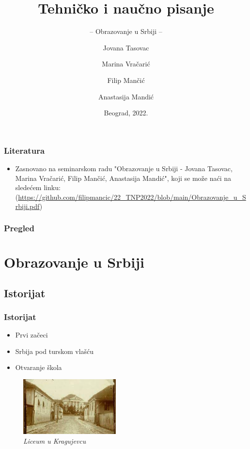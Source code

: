 \documentclass{beamer}
\title{Tehničko i naučno pisanje}
\subtitle{-- Obrazovanje u Srbiji --}
\author{Jovana Tasovac \and Marina Vračarić\\ \and Filip Mančić \and Anastasija Mandić}
\institute{Matematički fakultet\\Univerzitet u Beogradu}
\date{
	\footnotesize{Beograd, 2022.}	
}
\begin{document}
\begin{frame}
	\thispagestyle{empty}
	\titlepage
\end{frame}

\addtocounter{framenumber}{-1}

\begin{frame}[fragile]\frametitle{Literatura}
	\begin{itemize}
		\item Zasnovano na seminarskom radu "Obrazovanje u Srbiji - Jovana Tasovac, Marina Vračarić, Filip Mančić, Anastasija Mandić", koji se može naći na sledećem linku:
		(\url{https://github.com/filipmancic/22_TNP2022/blob/main/Obrazovanje_u_Srbiji.pdf})
	\end{itemize}
\end{frame}

\begin{frame}
	\frametitle{Pregled} %
	\tableofcontents[] 
\end{frame}
\section{Obrazovanje u Srbiji}

\subsection{Istorijat}

\begin{frame}[fragile]\frametitle{Istorijat}
	\begin{itemize}	
		\item Prvi začeci
		\item Srbija pod turskom vlašću
       \item Otvaranje škola
	\end{itemize}
 
        \begin{figure}[h!]
        \centering\includegraphics[height=3cm]{licej.jpg} 
        \caption{\emph{ Liceum u Kragujevcu}}
        \label{fig:liceum}
\end{figure}
 
\end{frame}
\end{document}
